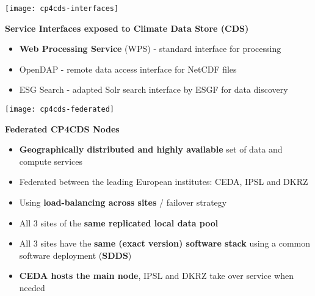 \documentclass[landscape,a0paper,fontscale=0.4]{baposter} %
\newcommand{\compresslist}{%
\setlength{\itemsep}{1pt}%
\setlength{\parskip}{0pt}%
\setlength{\parsep}{0pt}%
}
\begin{document}
\begin{poster}
{  \begin{minipage}{0.4\textwidth}
    \texttt{[image: cp4cds-interfaces]}
  \end{minipage}
  \begin{minipage}{0.6\textwidth}
    {\bf Service Interfaces exposed to Climate Data Store (CDS)}
    \begin{itemize}\compresslist
      \item {\bf Web Processing Service} (WPS) - standard interface for processing
      \item OpenDAP - remote data access interface for NetCDF files
      \item ESG Search - adapted Solr search interface by ESGF for data discovery
    \end{itemize}
 \end{minipage}

 \begin{minipage}{0.4\textwidth}
    \texttt{[image: cp4cds-federated]}
  \end{minipage}
  \begin{minipage}{0.6\textwidth}
    {\bf Federated CP4CDS Nodes}
    \begin{itemize}\compresslist
      \item {\bf Geographically distributed and highly available} set of data and compute services
      \item Federated between the leading European institutes: CEDA, IPSL and DKRZ
      \item Using {\bf load-balancing across sites} / failover strategy
      \item All 3 sites of the {\bf same replicated local data pool}
      \item All 3 sites have the {\bf same (exact version) software stack} using a common software deployment ({\bf SDDS})
      \item {\bf CEDA hosts the main node}, IPSL and DKRZ take over service when needed
    \end{itemize}
  \end{minipage}
 }


\end{poster}
\end{document}
